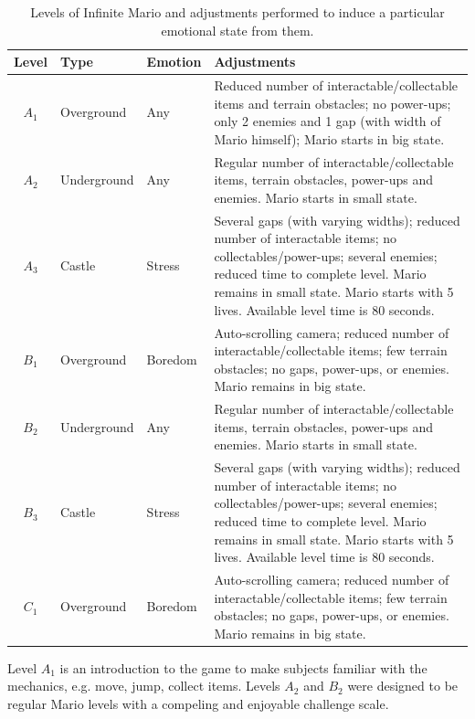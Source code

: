 \begin{landscape}
\begin{table}
    \centering
    \caption{Levels of Infinite Mario and adjustments performed to induce a particular emotional state from them.}
    \label{table:experiment2-mario-levels}
    \begin{tabular}[l]{@{}cllp{9.5cm}}
        \hline
            \textbf{Level} & \textbf{Type} & \textbf{Emotion} & \textbf{Adjustments} \\
        \hline
            $A_1$ & Overground  & Any & Reduced number of interactable/collectable items and terrain obstacles; no power-ups; only 2 enemies and 1 gap (with width of Mario himself); Mario starts in big state. \\
            $A_2$ & Underground & Any & Regular number of interactable/collectable items, terrain obstacles, power-ups and enemies. Mario starts in small state. \\
            $A_3$ & Castle      & Stress  & Several gaps (with varying widths); reduced number of interactable items; no collectables/power-ups; several enemies; reduced time to complete level. Mario remains in small state. Mario starts with 5 lives. Available level time is 80 seconds. \\
            $B_1$ & Overground  & Boredom & Auto-scrolling camera; reduced number of interactable/collectable items; few terrain obstacles; no gaps, power-ups, or enemies. Mario remains in big state. \\
            $B_2$ & Underground & Any & Regular number of interactable/collectable items, terrain obstacles, power-ups and enemies. Mario starts in small state. \\
            $B_3$ & Castle      & Stress  & Several gaps (with varying widths); reduced number of interactable items; no collectables/power-ups; several enemies; reduced time to complete level. Mario remains in small state. Mario starts with 5 lives. Available level time is 80 seconds. \\
            $C_1$ & Overground  & Boredom & Auto-scrolling camera; reduced number of interactable/collectable items; few terrain obstacles; no gaps, power-ups, or enemies. Mario remains in big state. \\
        \hline
    \end{tabular}
\end{table}
\end{landscape}

Level $A_1$ is an introduction to the game to make subjects familiar with the mechanics, e.g. move, jump, collect items. Levels $A_2$ and $B_2$ were designed to be regular Mario levels with a compeling and enjoyable challenge scale.

